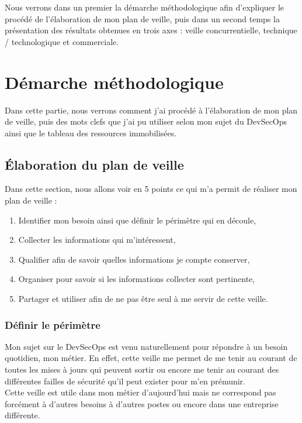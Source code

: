 \documentclass[11pt,a4paper,oneside]{book}
\begin{document}
Nous verrons dans un premier la démarche méthodologique afin d'expliquer le procédé de l'élaboration de mon plan de veille, puis dans un second temps la présentation des résultats obtenues en trois axes : veille concurrentielle, technique / technologique et commerciale.


\chapter{Démarche méthodologique}

Dans cette partie, nous verrons comment j'ai procédé à l'élaboration de mon plan de veille, puis des mots clefs que j'ai pu utiliser selon mon sujet du DevSecOps ainsi que le tableau des ressources immobilisées.

\section{Élaboration du plan de veille}

Dans cette section, nous allons voir en 5 points ce qui m'a permit de réaliser mon plan de veille :
\begin{enumerate}
\item Identifier mon besoin ainsi que définir le périmètre qui en découle,
\item Collecter les informations qui m'intéressent,
\item Qualifier afin de savoir quelles informations je compte conserver,
\item Organiser pour savoir si les informations collecter sont pertinente,
\item Partager et utiliser afin de ne pas être seul à me servir de cette veille.
\end{enumerate}


\subsection{Définir le périmètre}

Mon sujet sur le DevSecOps est venu naturellement pour répondre à un besoin quotidien, mon métier.
En effet, cette veille me permet de me tenir au courant de toutes les mises à jours qui peuvent sortir ou encore me tenir au courant des différentes failles de sécurité qu'il peut exister pour m'en prémunir. \\

Cette veille est utile dans mon métier d'aujourd'hui mais ne correspond pas forcément à d'autres besoins à d'autres postes ou encore dans une entreprise différente. \\
\end{document}
